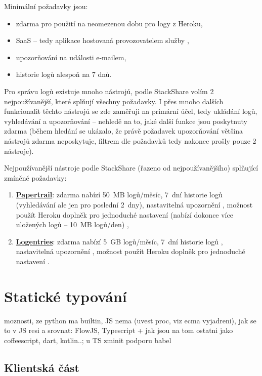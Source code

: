 Minimální požadavky jsou:
\begin{itemize}
    \item zdarma pro použití na neomezenou dobu pro logy z Heroku,
    \item SaaS -- tedy aplikace hostovaná provozovatelem služby \cite{oracle-saas},
    \item upozorňování na události e-mailem,
    \item historie logů alespoň na 7 dnů.
\end{itemize}

Pro správu logů existuje mnoho nástrojů, podle StackShare \cite{stackshare-log} volím 2 nejpoužívanější, které splňují všechny požadavky. I přes mnoho dalších funkcionalit těchto nástrojů se zde zaměřuji na primární účel, tedy ukládání logů, vyhledávání a upozorňování -- nehledě na to, jaké další funkce jsou poskytnuty zdarma (během hledání se ukázalo, že právě požadavek upozorňování většina nástrojů zdarma neposkytuje, filtrem dle požadavků tedy nakonec prošly pouze 2 nástroje).

Nejpoužívanější nástroje podle StackShare (řazeno od nejpoužívanějšího) \cite{stackshare-log} splňující zmíněné požadavky:
\begin{enumerate}
    \item \href{https://www.papertrail.com/}{\textbf{Papertrail}}: zdarma nabízí 50~MB logů/měsíc, 7~dní historie logů (vyhledávání ale jen pro poslední 2~dny), nastavitelná upozornění \cite{papertrail-pricing}, možnost použít Heroku doplněk pro jednoduché nastavení (nabízí dokonce více uložených logů -- 10~MB logů/den) \cite{heroku-papertrail},
    \item \href{https://logentries.com/}{\textbf{Logentries}}: zdarma nabízí 5~GB logů/měsíc, 7~dní historie logů \cite{logentries-pricing}, nastavitelná upozornění \cite{logentries-pricing2}, možnost použít Heroku doplněk pro jednoduché nastavení \cite{heroku-logentries}.
\end{enumerate}


\section{Statické typování}
moznosti, ze python ma builtin, JS nema (uvest proc, viz ecma vyjadreni), jak se to v JS resi a srovnat: FlowJS, Typescript + jak jsou na tom ostatni jako coffeescript, dart, kotlin..; u TS zminit podporu babel

\subsection{Klientská část}


